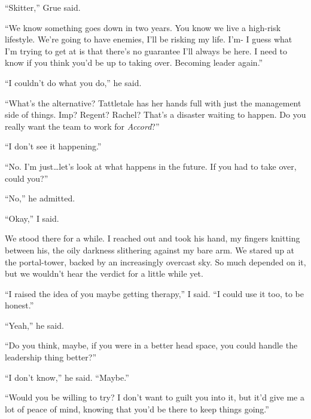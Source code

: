``Skitter,'' Grue said.



``We know something goes down in two years.  You know we live a high-risk lifestyle.  We're going to have enemies, I'll be risking my life.  I'm-  I guess what I'm trying to get at is that there's no guarantee I'll always be here.  I need to know if you think you'd be up to taking over.  Becoming leader again.''



``I couldn't do what you do,'' he said.



``What's the alternative?  Tattletale has her hands full with just the management side of things.  Imp?  Regent?  Rachel?  That's a disaster waiting to happen.  Do you really want the team to work for \emph{Accord}?''



``I don't see it happening.''



``No.  I'm just\ldots let's look at what happens in the future.  If you had to take over, could you?''



``No,'' he admitted.



``Okay,'' I said.



We stood there for a while.  I reached out and took his hand, my fingers knitting between his, the oily darkness slithering against my bare arm.  We stared up at the portal-tower, backed by an increasingly overcast sky.  So much depended on it, but we wouldn't hear the verdict for a little while yet.



``I raised the idea of you maybe getting therapy,'' I said.  ``I could use it too, to be honest.''



``Yeah,'' he said.



``Do you think, maybe, if you were in a better head space, you could handle the leadership thing better?''



``I don't know,'' he said.  ``Maybe.''



``Would you be willing to try?  I don't want to guilt you into it, but it'd give me a lot of peace of mind, knowing that you'd be there to keep things going.''



